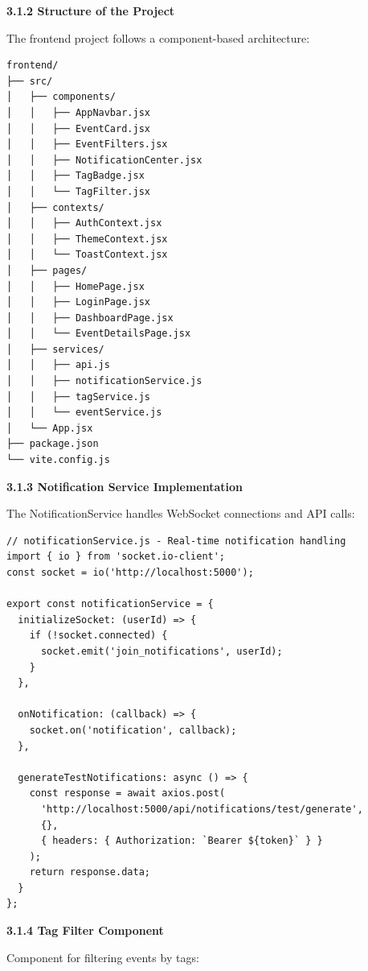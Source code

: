 \documentclass[12pt]{report}
\begin{document}
\textbf{3.1.2 Structure of the Project}

The frontend project follows a component-based architecture:

\begin{lstlisting}
frontend/
├── src/
│   ├── components/
│   │   ├── AppNavbar.jsx
│   │   ├── EventCard.jsx
│   │   ├── EventFilters.jsx
│   │   ├── NotificationCenter.jsx
│   │   ├── TagBadge.jsx
│   │   └── TagFilter.jsx
│   ├── contexts/
│   │   ├── AuthContext.jsx
│   │   ├── ThemeContext.jsx
│   │   └── ToastContext.jsx
│   ├── pages/
│   │   ├── HomePage.jsx
│   │   ├── LoginPage.jsx
│   │   ├── DashboardPage.jsx
│   │   └── EventDetailsPage.jsx
│   ├── services/
│   │   ├── api.js
│   │   ├── notificationService.js
│   │   ├── tagService.js
│   │   └── eventService.js
│   └── App.jsx
├── package.json
└── vite.config.js
\end{lstlisting}

\textbf{3.1.3 Notification Service Implementation}

The NotificationService handles WebSocket connections and API calls:

\begin{lstlisting}
// notificationService.js - Real-time notification handling
import { io } from 'socket.io-client';
const socket = io('http://localhost:5000');

export const notificationService = {
  initializeSocket: (userId) => {
    if (!socket.connected) {
      socket.emit('join_notifications', userId);
    }
  },

  onNotification: (callback) => {
    socket.on('notification', callback);
  },

  generateTestNotifications: async () => {
    const response = await axios.post(
      'http://localhost:5000/api/notifications/test/generate',
      {},
      { headers: { Authorization: `Bearer ${token}` } }
    );
    return response.data;
  }
};
\end{lstlisting}

\textbf{3.1.4 Tag Filter Component}

Component for filtering events by tags:
\end{document}
